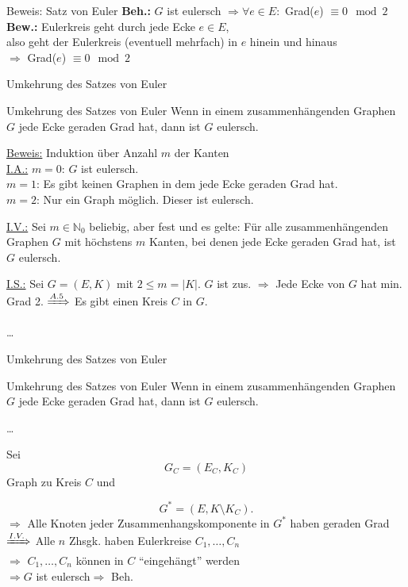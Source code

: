 \begin{frame}{Beweis: Satz von Euler}
\textbf{Beh.:} $G$ ist eulersch $\Rightarrow \forall e \in E: $ Grad($e$) $\equiv 0 \mod 2$ \pause \\
\textbf{Bew.:} Eulerkreis geht durch jede Ecke $e \in E$\pause,  \\
also geht der Eulerkreis (eventuell mehrfach) in $e$ hinein und hinaus \pause \\
$\Rightarrow$ Grad($e$) $\equiv 0 \mod 2$
\end{frame}

\begin{frame}{Umkehrung des Satzes von Euler}
\begin{block}{Umkehrung des Satzes von Euler}
Wenn in einem zusammenhängenden Graphen $G$ jede Ecke geraden Grad hat, dann 
ist $G$ eulersch.
\end{block}
\pause
\underline{Beweis:} Induktion über Anzahl $m$ der Kanten\\
\pause
\underline{I.A.:} $m=0$: $G$ ist eulersch. \cmark\\
\pause
$m=1$: Es gibt keinen Graphen in dem jede Ecke geraden Grad hat. \cmark\\
\pause
$m=2$: Nur ein Graph möglich. Dieser ist eulersch. \cmark\\
\pause

\underline{I.V.:} Sei $m \in \mathbb{N}_0$ beliebig, aber fest und 
es gelte: Für 
alle zusammenhängenden Graphen $G$ mit höchstens $m$ Kanten, bei 
denen jede Ecke geraden Grad hat, ist $G$ eulersch.

\pause

\underline{I.S.:} Sei $G=(E,K)$ mit $2 \leq m  = |K|$. $G$ ist zus. \pause
$\Rightarrow$ Jede Ecke von $G$ hat min. Grad 2. \pause
$\xRightarrow[]{A. 5}$ Es gibt einen Kreis $C$ in $G$.\pause

\dots

\end{frame}

\begin{frame}{Umkehrung des Satzes von Euler}
\begin{block}{Umkehrung des Satzes von Euler}
Wenn in einem zusammenhängenden Graphen $G$ jede Ecke geraden Grad hat, dann 
ist $G$ eulersch.
\end{block}
\dots

Sei
\[G_C = (E_C, K_C) \]
Graph zu Kreis $C$ und

\[G^* = (E, K \setminus K_C).\] \pause
$\Rightarrow$ Alle Knoten jeder Zusammenhangskomponente in $G^*$ haben geraden Grad\\
\pause
$\xRightarrow[]{I.V.}$ Alle $n$ Zhsgk. haben Eulerkreise $C_1, \dots, C_n$\\
\pause
$\Rightarrow$ $C_1, \dots, C_n$ können in $C$ \enquote{eingehängt} werden\\
\pause
$\Rightarrow G$ ist eulersch\pause $\Rightarrow $ Beh.
\end{frame}

